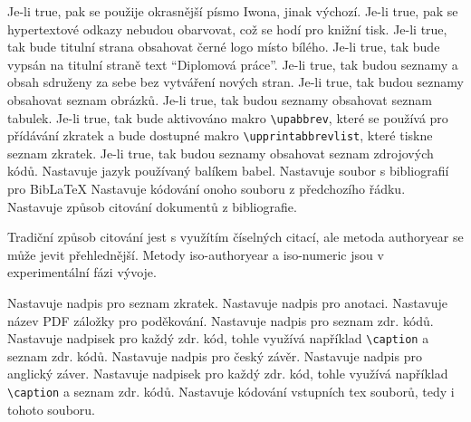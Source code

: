 \documentclass[a4paper,12pt]{article}
\begin{document}
\begin{optionlist}
Je-li true, pak se použije okrasnější písmo Iwona, jinak výchozí.
Je-li true, pak se hypertextové odkazy nebudou obarvovat, což se hodí pro knižní tisk.
Je-li true, tak bude titulní strana obsahovat černé logo místo bílého.
Je-li true, tak bude vypsán na titulní straně text \enquote{Diplomová práce}.
Je-li true, tak budou seznamy a obsah sdruženy za sebe bez vytváření nových stran. 
Je-li true, tak budou seznamy obsahovat seznam obrázků.
Je-li true, tak budou seznamy obsahovat seznam tabulek.
Je-li true, tak bude aktivováno makro \verb|\upabbrev|, které se používá pro přídávání zkratek a bude dostupné makro \verb|\upprintabbrevlist|, které tiskne seznam zkratek.
Je-li true, tak budou seznamy obsahovat seznam zdrojových kódů. 
Nastavuje jazyk používaný balíkem babel. 
Nastavuje soubor s bibliografií pro Bib\LaTeX  
{}
Nastavuje kódování onoho souboru z předchozího řádku. 
Nastavuje způsob citování dokumentů z bibliografie.

Tradiční způsob citování jest s využítím číselných citací, ale metoda authoryear se může jevit přehlednější. Metody iso-authoryear a iso-numeric jsou v experimentální fázi vývoje.

Nastavuje nadpis pro seznam zkratek. 
Nastavuje nadpis pro anotaci.
Nastavuje název PDF záložky pro poděkování.
Nastavuje nadpis pro seznam zdr. kódů.
Nastavuje nadpisek pro každý zdr. kód, tohle využívá například \verb|\caption| a seznam zdr. kódů. 
Nastavuje nadpis pro český závěr.
Nastavuje nadpis pro anglický záver.
Nastavuje nadpisek pro každý zdr. kód, tohle využívá například \verb|\caption| a seznam zdr. kódů. 
Nastavuje kódování vstupních tex souborů, tedy i tohoto souboru. 
\end{optionlist}
\end{document}
